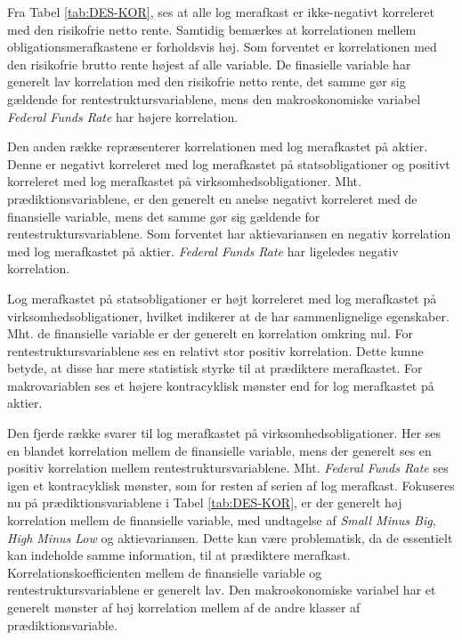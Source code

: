 \documentclass[
  a4paper,
  oneside]{memoir}
\begin{document}
Fra Tabel \ref{tab:DES-KOR}, ses at alle log merafkast er ikke-negativt korreleret med den risikofrie netto rente. Samtidig bemærkes at korrelationen mellem obligationsmerafkastene er forholdsvis høj. Som forventet er korrelationen med den risikofrie brutto rente højest af alle variable. De finasielle variable har generelt lav korrelation med den risikofrie netto rente, det samme gør sig gældende for rentestruktursvariablene, mens den makroøkonomiske variabel \emph{Federal Funds Rate} har højere korrelation.

Den anden række repræsenterer korrelationen med log merafkastet på aktier. Denne er negativt korreleret med log merafkastet på statsobligationer og positivt korreleret med log merafkastet på virksomhedsobligationer. Mht. prædiktionsvariablene, er den generelt en anelse negativt korreleret med de finansielle variable, mens det samme gør sig gældende for rentestruktursvariablene. Som forventet har aktievariansen en negativ korrelation med log merafkastet på aktier. \emph{Federal Funds Rate} har ligeledes negativ korrelation.

Log merafkastet på statsobligationer er højt korreleret med log merafkastet på virksomhedsobligationer, hvilket indikerer at de har sammenlignelige egenskaber. Mht. de finansielle variable er der generelt en korrelation omkring nul. For rentestruktursvariablene ses en relativt stor positiv korrelation. Dette kunne betyde, at disse har mere statistisk styrke til at prædiktere merafkastet. For makrovariablen ses et højere kontracyklisk mønster end for log merafkastet på aktier.

Den fjerde række svarer til log merafkastet på virksomhedsobligationer. Her ses en blandet korrelation mellem de finansielle variable, mens der generelt ses en positiv korrelation mellem rentestruktursvariablene. Mht. \emph{Federal Funds Rate} ses igen et kontracyklisk mønster, som for resten af serien af log merafkast. Fokuseres nu på prædiktionsvariablene i Tabel \ref{tab:DES-KOR}, er der generelt høj korrelation mellem de finansielle variable, med undtagelse af \emph{Small Minus Big}, \emph{High Minus Low} og aktievariansen. Dette kan være problematisk, da de essentielt kan indeholde samme information, til at prædiktere merafkast. Korrelationskoefficienten mellem de finansielle variable og rentestruktursvariablene er generelt lav. Den makroøkonomiske variabel har et generelt mønster af høj korrelation mellem af de andre klasser af prædiktionsvariable.
\end{document}
